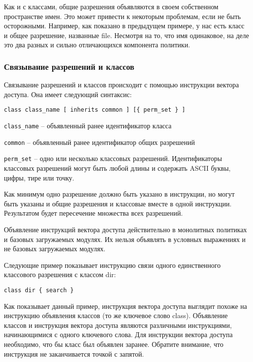 \documentclass{./../class/UIR}
\begin{document}
    Как и с классами, общие разрешения объявляются в своем собственном пространстве
    имен. Это может привести к некоторым проблемам, если не быть осторожными.
    Например, как показано в предыдущем примере, у нас есть класс и общее
    разрешение, названные file. Несмотря на то, что имя одинаковое, на деле это два
    разных и сильно отличающихся компонента политики.

\subsubsection{Связывание разрешений и классов}
    Связывание разрешений и классов происходит с помощью инструкции вектора
    доступа. Она имеет следующий синтаксис:
	
\begin{verbatim}
class class_name [ inherits common ] [{ perm_set } ]
\end{verbatim}
	
	\verb"class_name" – объявленный ранее идентификатор класса
	
	\verb"common" – объявленный ранее идентификатор общих разрешений
	
	\verb"perm_set" – одно или несколько классовых разрешений. Идентификаторы
	классовых разрешений могут быть любой длины и содержать ASCII буквы, цифры,
	тире или точку.

    Как минимум одно разрешение должно быть указано в инструкции, но могут быть
    указаны и общие разрешения и классовые вместе в одной инструкции. Результатом
    будет пересечение множества всех разрешений.

    Объявление инструкций вектора доступа действительно в монолитных политиках и
    базовых загружаемых модулях. Их нельзя объявлять в условных выражениях и не
    базовых загружаемых модулях.

    Следующие пример показывает инструкцию связи одного единственного классового
    разрешения с классом dir:
\begin{verbatim}
class dir { search }
\end{verbatim}
    Как показывает данный пример, инструкция вектора доступа выглядит похоже на
    инструкцию объявления классов (то же ключевое слово class). Объявление
    классов и инструкция вектора доступа являются различными инструкциями,
    начинающимися с одного ключевого слова. Для инструкции вектора доступа
    необходимо, что бы класс был объявлен заранее. Обратите внимание, что
    инструкция не заканчивается точкой с запятой.
\end{document}
